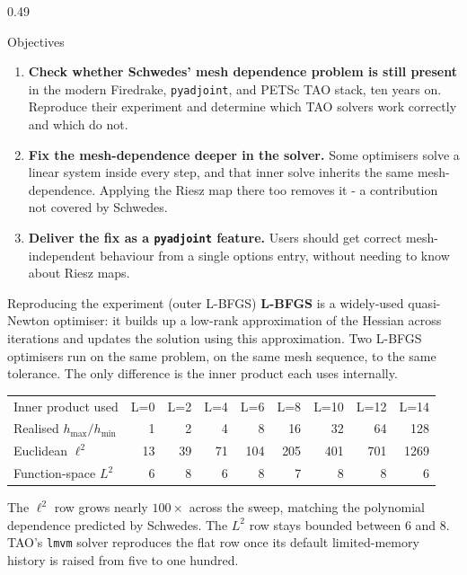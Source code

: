 \documentclass[final]{beamer}
\begin{document}
\begin{frame}[t]
\begin{columns}[t,totalwidth=\dimexpr\paperwidth-3cm\relax]
\begin{column}{0.49\dimexpr\paperwidth-3cm\relax}
\begin{block}{Objectives}
\begin{enumerate}
\item \textbf{Check whether Schwedes' mesh dependence problem is still present} in the modern Firedrake, \texttt{pyadjoint}, and PETSc TAO stack, ten years on. Reproduce their experiment and determine which TAO solvers work correctly and which do not.
\item \textbf{Fix the mesh-dependence deeper in the solver.} Some optimisers solve a linear system inside every step, and that inner solve inherits the same mesh-dependence. Applying the Riesz map there too removes it - a contribution not covered by Schwedes.
\item \textbf{Deliver the fix as a \texttt{pyadjoint} feature.} Users should get correct mesh-independent behaviour from a single options entry, without needing to know about Riesz maps.
\end{enumerate}
\end{block}

\begin{block}{Reproducing the experiment (outer L-BFGS)}
\textbf{L-BFGS} is a widely-used quasi-Newton optimiser: it builds up a low-rank approximation of the Hessian across iterations and updates the solution using this approximation. Two L-BFGS optimisers run on the same problem, on the same mesh sequence, to the same tolerance. The only difference is the inner product each uses internally.

\vspace{0.3em}
\centering\small
\begin{tabular}{lrrrrrrrr}
\toprule
Inner product used & L=0 & L=2 & L=4 & L=6 & L=8 & L=10 & L=12 & L=14 \\
Realised $h_{\max}/h_{\min}$          & 1 & 2 & 4 & 8 & 16 & 32 & 64 & 128 \\
\midrule
Euclidean $\ell^{2}$                  & 13 & 39 & 71 & 104 & 205 & 401 & 701 & 1269 \\
Function-space $L^{2}$                & 6 & 8 & 6 & 8 & 7 & 8 & 8 & 6 \\
\bottomrule
\end{tabular}

\vspace{0.4em}
\justifying
The $\ell^{2}$ row grows nearly $100\times$ across the sweep, matching the polynomial dependence predicted by Schwedes. The $L^{2}$ row stays bounded between 6 and 8. TAO's \texttt{lmvm} solver reproduces the flat row once its default limited-memory history is raised from five to one hundred.
\end{block}


\end{column}
\end{columns}
\end{frame}
\end{document}
